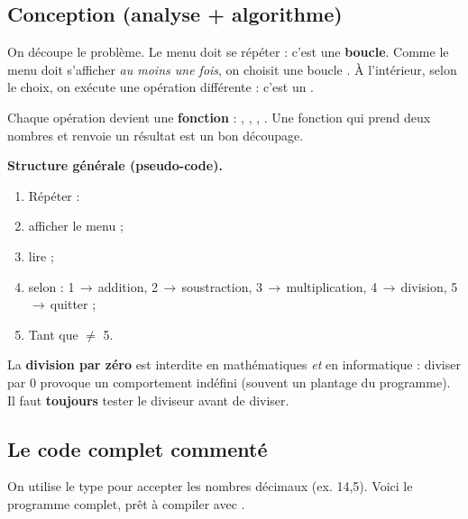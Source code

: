 \subsection{Conception (analyse + algorithme)}

On découpe le problème. Le menu doit se répéter : c'est une \textbf{boucle}. Comme
le menu doit s'afficher \emph{au moins une fois}, on choisit une boucle
. À l'intérieur, selon le choix, on exécute une opération
différente : c'est un .

Chaque opération devient une \textbf{fonction} : , ,
, . Une fonction qui prend deux nombres et
renvoie un résultat est un bon découpage.

\begin{methode}
\textbf{Structure générale (pseudo-code).}
\begin{enumerate}[label=\arabic*)]
  \item Répéter :
  \item \quad afficher le menu ;
  \item \quad lire  ;
  \item \quad selon  : 1\,$\to$\,addition, 2\,$\to$\,soustraction,
        3\,$\to$\,multiplication, 4\,$\to$\,division, 5\,$\to$\,quitter ;
  \item Tant que  $\ne$ 5.
\end{enumerate}
\end{methode}

\begin{attention}
La \textbf{division par zéro} est interdite en mathématiques \emph{et} en
informatique : diviser par 0 provoque un comportement indéfini (souvent un plantage
du programme). Il faut \textbf{toujours} tester le diviseur avant de diviser.
\end{attention}

\subsection{Le code complet commenté}

On utilise le type  pour accepter les nombres décimaux (ex. 14,5).
Voici le programme complet, prêt à compiler avec .

